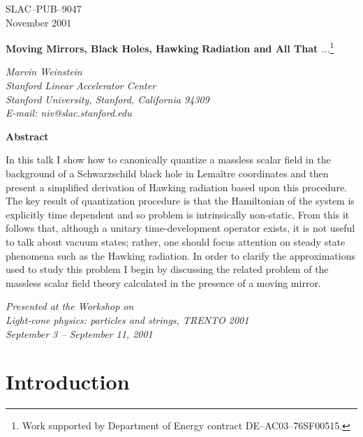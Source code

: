 \documentclass[12pt]{article}
\begin{document}
\begin{flushright}
{\small
SLAC--PUB--9047\\
November 2001\\}
\end{flushright}

\vfill

\begin{center}
{{\bf\LARGE Moving Mirrors, Black Holes, Hawking}
\vskip 20pt
{\bf\LARGE Radiation and
All That $\ldots$}\footnote{Work supported by Department
of Energy contract DE--AC03--76SF00515.}}

\bigskip
{\it Marvin Weinstein \\
Stanford Linear Accelerator Center \\
Stanford University, Stanford, California 94309 \\
E-mail:  niv@slac.stanford.edu}
\medskip
\end{center}

\vfill

\begin{center}
{\bf\large
Abstract }
\end{center}

In this talk I show how to
canonically quantize a massless scalar field in the 
background of a Schwarzschild black hole in Lema\^itre coordinates and
then present a simplified derivation of Hawking radiation based upon
this procedure.
The key result of quantization procedure is that 
the Hamiltonian of the system is explicitly time dependent and so 
problem is intrinsically non-static.
From this it follows that, although a unitary time-development operator exists,
it is not useful to talk about vacuum states; rather, one should
focus attention on steady state phenomena such as the
Hawking radiation.  In order to clarify the approximations used
to study this problem I begin by discussing the related
problem of the massless scalar field theory calculated in the
presence of a moving mirror.

\vfill

\begin{center}
{\it Presented at the Workshop on \\
Light-cone physics: particles and
strings, TRENTO 2001\\
September 3 -- September 11, 2001 }\\
\end{center}

\vfill \newpage




\section{Introduction}
\end{document}
